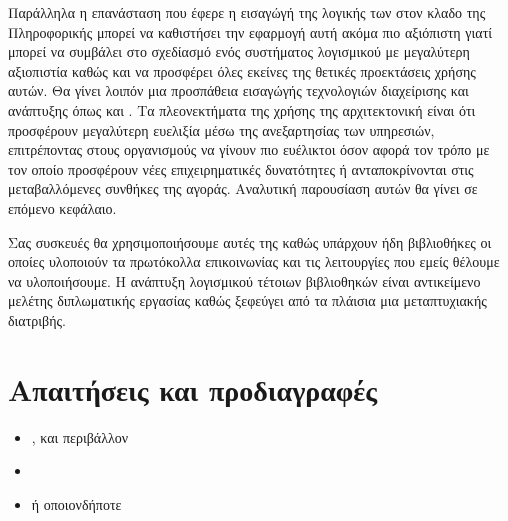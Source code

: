 Παράλληλα η επανάσταση που έφερε η εισαγώγή της λογικής των  στον κλαδο της Πληροφορικής μπορεί να καθιστήσει την εφαρμογή αυτή ακόμα πιο αξιόπιστη
γιατί μπορεί να συμβάλει στο σχεδίασμό ενός συστήματος λογισμικού με μεγαλύτερη αξιοπιστία καθώς και να προσφέρει όλες εκείνες της θετικές προεκτάσεις χρήσης αυτών.
Θα γίνει λοιπόν μια προσπάθεια εισαγώγής τεχνολογιών διαχείρισης και ανάπτυξης  όπως  και . Τα πλεονεκτήματα της χρήσης της αρχιτεκτονική  είναι ότι προσφέρουν μεγαλύτερη ευελιξία 
μέσω της ανεξαρτησίας των υπηρεσιών, επιτρέποντας στους οργανισμούς να γίνουν πιο ευέλικτοι όσον αφορά τον τρόπο με τον οποίο προσφέρουν νέες επιχειρηματικές δυνατότητες ή ανταποκρίνονται στις μεταβαλλόμενες συνθήκες της αγοράς. Αναλυτική παρουσίαση αυτών θα γίνει σε επόμενο κεφάλαιο. 

Σας συσκευές θα χρησιμοποιήσουμε αυτές της  καθώς υπάρχουν ήδη βιβλιοθήκες οι οποίες υλοποιούν τα πρωτόκολλα επικοινωνίας και τις λειτουργίες που 
εμείς θέλουμε να υλοποιήσουμε. Η ανάπτυξη λογισμικού τέτοιων βιβλιοθηκών είναι αντικείμενο μελέτης διπλωματικής εργασίας καθώς ξεφεύγει από τα πλάισια μια μεταπτυχιακής διατριβής.

\section{Απαιτήσεις και προδιαγραφές}
\begin{itemize}
    \item {} ,  και  περιβάλλον
    \item {}
    \item {} ή οποιονδήποτε 
\end{itemize}





